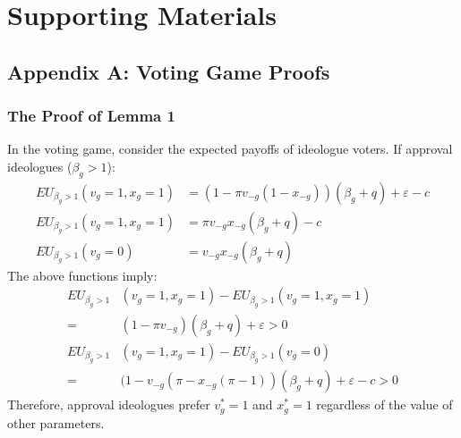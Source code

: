 
\clearpage
\appendix
\pagestyle{plain}
\setcounter{page}{1}

\section{Supporting Materials} %


\subsection{Appendix A: Voting Game Proofs}

\subsubsection{The Proof of Lemma 1}

\par In the voting game, consider the expected payoffs of ideologue voters. 
If approval ideologues ($\beta_g > 1$):
\begin{align*}
EU_{\beta_g > 1 }(v_g=1, x_g=1) &= (1-\pi v_{-g} (1- x_{-g}))(\beta_g + q) + \varepsilon - c \\
EU_{\beta_g > 1 }(v_g=1, x_g=1) &= \pi v_{-g} x_{-g} (\beta_g + q) - c \\
EU_{\beta_g > 1 }(v_g=0) &= v_{-g} x_{-g} (\beta_g + q)
\end{align*} 
\noindent The above functions imply: 
\begin{align*}
EU_{\beta_g > 1}&(v_g=1, x_g=1) - EU_{\beta_g > 1 }(v_g=1, x_g=1) \\
=& (1- \pi v_{-g})(\beta_g + q) + \varepsilon > 0 \\
EU_{\beta_g > 1}&(v_g=1, x_g=1) - EU_{\beta_g > 1 }(v_g=0)  \\
=& (1-v_{-g} (\pi - x_{-g}(\pi - 1))(\beta_g + q) + \varepsilon -c > 0 
\end{align*}
\noindent Therefore, approval ideologues prefer $v^*_g=1$ and $x^*_g=1$ regardless of the value of other parameters.

